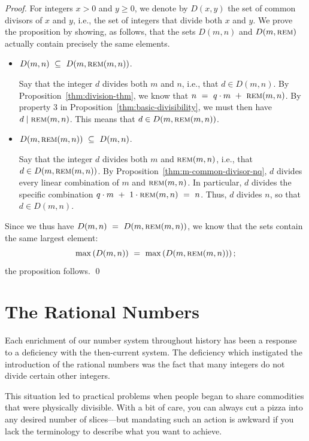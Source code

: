 \begin{proof}
For integers $x > 0$ and $y \geq 0$, we denote by $D(x,y)$ the set of common divisors of $x$ and $y$, i.e., the set of integers that divide both $x$ and $y$.  We prove the proposition by showing, as follows, that the sets $D(m, n)$ and $D(m, \mbox{\sc rem})$ actually contain precisely the same elements.
\begin{itemize}
\item 
$D(m, n) \ \subseteq \ D(m, \mbox{\sc rem}(m,n))$.

\smallskip

Say that the integer $d$ divides both $m$ and $n$, i.e., that $d \in D(m,n)$.  By Proposition~\ref{thm:division-thm}, we know that $n \ = \ q \cdot m \ + \ \mbox{\sc rem}(m,n)$.  By property 3 in Proposition~\ref{thm:basic-divisibility}, we must then have $d \mid
\mbox{\sc rem}(m,n)$.  This means that $d \in D(m, \mbox{\sc rem}(m,n))$.

\item 
$D(m, \mbox{\sc rem}(m,n)) \ \subseteq \ D(m,n)$.

\smallskip

Say that the integer $d$ divides both $m$ and $\mbox{\sc rem}(m,n)$, i.e., that $d \in D(m, \mbox{\sc rem}(m,n))$.  By Proposition~\ref{thm:m-common-divisor-nq}, $d$ divides every linear
combination of $m$ and $\mbox{\sc rem}(m,n)$.  In particular, $d$ divides the specific combination $q \cdot m \ + \ 1 \cdot \mbox{\sc rem}(m,n) \ = \ n$.  Thus, $d$ divides $n$, so that $d \in D(m,n)$.
\end{itemize}
Since we thus have $D(m, n) \ = \ D(m, \mbox{\sc rem}(m,n))$, we know that the sets contain the same largest element:
\[ \max\left( D(m, n) \right) \ = \ \max\left( D(m, \mbox{\sc rem}(m,n)) \right);
\]
the proposition follows.  \qed
\end{proof}


\section{The Rational Numbers}
\label{sec:rationals}

Each enrichment of our number system throughout history has been a response to a deficiency with the then-current system.  The deficiency which instigated the introduction of the rational numbers was the fact that many integers do not divide certain other integers.

This situation led to practical problems when people began to share commodities that were physically divisible.  With a bit of care, you can always cut a pizza into any desired number of slices---but mandating such an action is awkward if you lack the terminology to describe what you want to achieve.

